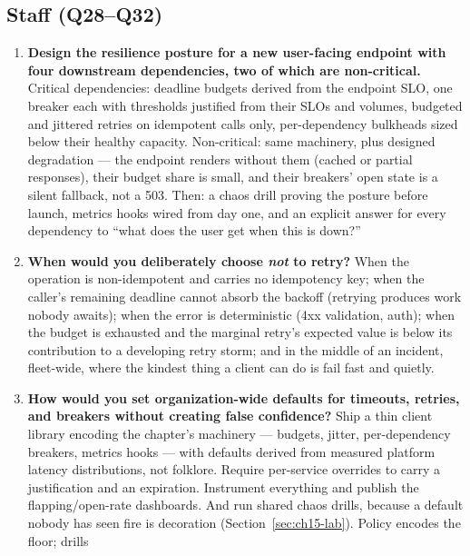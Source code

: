 \subsection*{Staff (Q28--Q32)}
\begin{enumerate}[label=\textbf{Q\arabic*.}, leftmargin=1.6cm, start=28]
  \item \textbf{Design the resilience posture for a new user-facing
        endpoint with four downstream dependencies, two of which are
        non-critical.}
        Critical dependencies: deadline budgets derived from the endpoint
        SLO, one breaker each with thresholds justified from their SLOs and
        volumes, budgeted and jittered retries on idempotent calls only,
        per-dependency bulkheads sized below their healthy capacity.
        Non-critical: same machinery, plus designed degradation --- the
        endpoint renders without them (cached or partial responses), their
        budget share is small, and their breakers' open state is a silent
        fallback, not a 503. Then: a chaos drill proving the posture before
        launch, metrics hooks wired from day one, and an explicit answer
        for every dependency to ``what does the user get when this is
        down?''
  \item \textbf{When would you deliberately choose \emph{not} to retry?}
        When the operation is non-idempotent and carries no idempotency
        key; when the caller's remaining deadline cannot absorb the backoff
        (retrying produces work nobody awaits); when the error is
        deterministic (4xx validation, auth); when the budget is exhausted
        and the marginal retry's expected value is below its contribution
        to a developing retry storm; and in the middle of an incident,
        fleet-wide, where the kindest thing a client can do is fail fast
        and quietly.
  \item \textbf{How would you set organization-wide defaults for timeouts,
        retries, and breakers without creating false confidence?}
        Ship a thin client library encoding the chapter's machinery ---
        budgets, jitter, per-dependency breakers, metrics hooks --- with
        defaults derived from measured platform latency distributions, not
        folklore. Require per-service overrides to carry a justification
        and an expiration. Instrument everything and publish the
        flapping/open-rate dashboards. And run shared chaos drills,
        because a default nobody has seen fire is decoration
        (Section~\ref{sec:ch15-lab}). Policy encodes the floor; drills

\end{enumerate}
